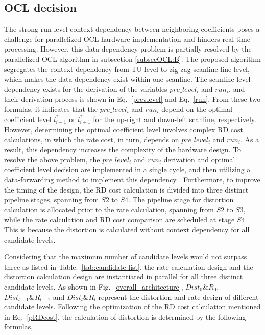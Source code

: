 \documentclass[lettersize,journal]{IEEEtran}
\begin{document}
\subsection{OCL decision}

The strong run-level context dependency between neighboring coefficients poses a challenge for parallelized OCL hardware implementation and hinders real-time processing. However, this data dependency problem is partially resolved by the parallelized OCL algorithm in subsection \ref{subsecOCL:B}. 
The proposed algorithm segregates the context dependency from TU-level to zig-zag scanline line level, which makes the data dependency exist within one scanline. The scanline-level dependency exists for the derivation of the variables $pre\_level_i$ and $run_i$, and their derivation process is shown in Eq.~\eqref{prevlevel} and Eq.~\eqref{run}. From these two formulas, it indicates that the $pre\_level_i$ and $run_i$ depend on the optimal coefficient level $l _{i-1}^{*}$ or $l _{i+1}^{*}$ for the up-right and down-left scanline, respectively. However, determining the optimal coefficient level involves complex RD cost calculations, in which the rate cost, in turn, depends on $pre\_level_i$ and $run_i$. As a result, this dependency increases the complexity of the hardware design. To resolve the above problem, the $pre\_level_i$ and $run_i$ derivation and optimal coefficient level decision are implemented in a single cycle, and then utilizing a data-forwarding method to implement this dependency \cite{harris2010digital}. 
Furthermore, to improve the timing of the design, the RD cost calculation is divided into three distinct pipeline stages, spanning from $S2$ to $S4$. 
The pipeline stage for distortion calculation is allocated prior to the rate calculation, spanning from $S2$ to $S3$, while the rate calculation and RD cost comparison are scheduled at stage $S4$. This is because the distortion is calculated without context dependency for all candidate levels. 

Considering that the maximum number of candidate levels would not surpass three as listed in Table.~\ref{tab:candidate list}, the rate calculation design and the distortion calculation design are instantiated in parallel for all three distinct candidate levels. As shown in Fig.~\ref{overall_architecture}, $Dist_{0}\&R_{0}$, $Dist_{l-1}\&R_{l-1}$ and $Dist_{l}\&R_{l}$ represent the distortion and rate design of different candidate levels. 
Following the optimization of the RD cost calculation mentioned in Eq.~\eqref{pRDcost}, the calculation of distortion is determined by the following formulas,
\end{document}
